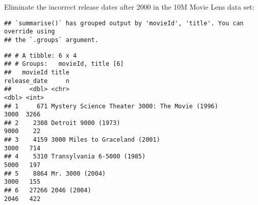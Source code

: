 \documentclass[
]{article}
\newenvironment{Shaded}{\begin{snugshade}}{\end{snugshade}}
\newcommand{\DecValTok}[1]{\textcolor[rgb]{0.00,0.00,0.81}{#1}}
\newcommand{\NormalTok}[1]{#1}
\newcommand{\OtherTok}[1]{\textcolor[rgb]{0.56,0.35,0.01}{#1}}
\newcommand{\SpecialCharTok}[1]{\textcolor[rgb]{0.00,0.00,0.00}{#1}}
\newcommand{\StringTok}[1]{\textcolor[rgb]{0.31,0.60,0.02}{#1}}
\begin{document}
\begin{Shaded}
\end{Shaded}

Eliminate the incorrect release dates after 2000 in the 10M Movie Lens
data set:

\begin{verbatim}
## `summarise()` has grouped output by 'movieId', 'title'. You can override using
## the `.groups` argument.
\end{verbatim}

\begin{verbatim}
## # A tibble: 6 x 4
## # Groups:   movieId, title [6]
##   movieId title                                          release_date     n
##     <dbl> <chr>                                                 <dbl> <int>
## 1     671 Mystery Science Theater 3000: The Movie (1996)         3000  3266
## 2    2308 Detroit 9000 (1973)                                    9000    22
## 3    4159 3000 Miles to Graceland (2001)                         3000   714
## 4    5310 Transylvania 6-5000 (1985)                             5000   197
## 5    8864 Mr. 3000 (2004)                                        3000   155
## 6   27266 2046 (2004)                                            2046   422
\end{verbatim}
\end{document}
